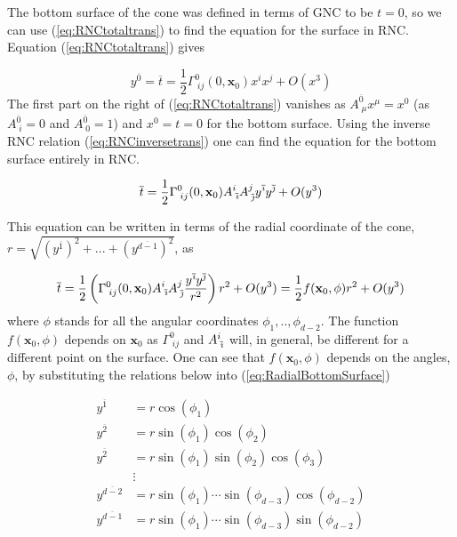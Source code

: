 \documentclass[12pt]{article}
\newcommand{\be}{\begin{equation}}
\newcommand{\ee}{\end{equation}}
\begin{document}
The bottom surface of the cone was defined in terms of GNC to be $t=0$, so we can use (\ref{eq:RNCtotaltrans}) to find the equation for the surface in RNC. Equation (\ref{eq:RNCtotaltrans}) gives

\be\label{eq:BottomSurfaceWithGNC}
y^{\overline{0}}=\overline{t}=\frac{1}{2}\Gamma^{0}_{\;ij}(0,\mathbf{x}_0)x^i x^j+O(x^3)
\ee
The first part on the right of (\ref{eq:RNCtotaltrans}) vanishes as $A^{\overline{0}}_{\;\mu}x^{\mu}=x^0$ (as $A^{\overline{0}}_{\;i}=0$ and $A^{\overline{0}}_{\;0}=1$) and $x^0=t=0$ for the bottom surface. Using the inverse RNC relation (\ref{eq:RNCinversetrans}) one can find the equation for the bottom surface entirely in RNC.

\be\label{eq:BottomSurface}
\overline{t}=\frac{1}{2}\Gamma^{0}_{\;ij}(0,\mathbf{x}_0)A^{i}_{\;\overline{\emph\i}}A^{j}_{\;\overline{\emph\j}}y^{\overline{\emph\i}} y^{\overline{\emph\j}}+O(y^3)
\ee

This equation can be written in terms of the radial coordinate of the cone, $r=\sqrt{(y^{\overline{1}})^2+...+(y^{\overline{d-1}})^2}$, as

\be\label{eq:RadialBottomSurface}
\overline{t}=\frac{1}{2}\left(\Gamma^{0}_{\;ij}(0,\mathbf{x}_0)A^{i}_{\;\overline{\emph\i}}A^{j}_{\;\overline{\emph\j}}\frac{y^{\overline{\emph\i}} y^{\overline{\emph\j}}}{r^2}\right)r^2+O(y^3)=\frac{1}{2}f(\mathbf{x}_0,\phi)r^2+O(y^3)
\ee
where $\phi$ stands for all the angular coordinates $\phi_1,..,\phi_{d-2}$. The function $f(\mathbf{x}_0,\phi)$ depends on $\mathbf{x}_0$ as $\Gamma^{0}_{\;ij}$ and $A^{i}_{\;\overline{\emph\i}}$ will, in general, be different for a different point on the surface. One can see that $f(\mathbf{x}_0,\phi)$ depends on the angles, $\phi$, by substituting the relations below into (\ref{eq:RadialBottomSurface})

\begin{equation}
\begin{aligned}\label{eq:SphericalCoords}
y^{\overline{1}} &= r \cos(\phi_1)  \\
y^{\overline{2}} &= r \sin(\phi_1) \cos(\phi_2)  \\
y^{\overline{2}} &= r \sin(\phi_1) \sin(\phi_2) \cos(\phi_3)  \\
    &\vdots  \\
y^{\overline{d-2}} &= r \sin(\phi_1) \cdots \sin(\phi_{d-3}) \cos(\phi_{d-2})  \\
y^{\overline{d-1}} &= r \sin(\phi_1) \cdots \sin(\phi_{d-3}) \sin(\phi_{d-2})
\end{aligned}
\end{equation}
\end{document}

